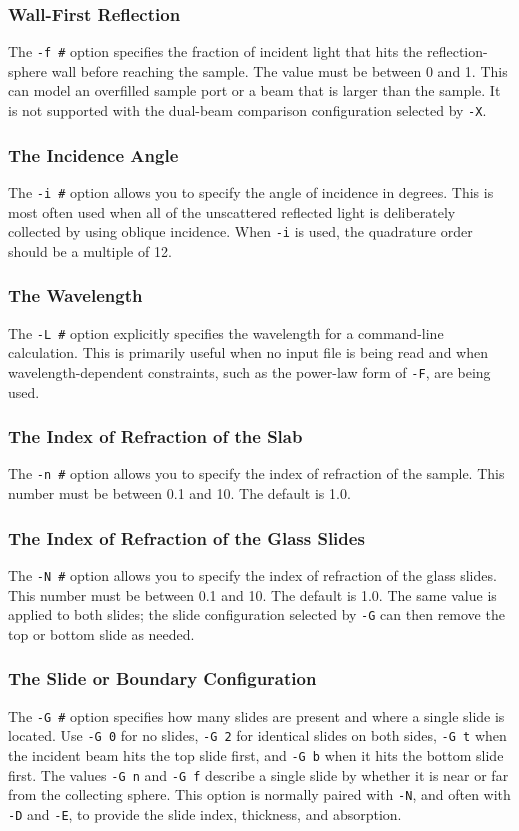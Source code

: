 \documentclass{article}
\begin{document}
\subsubsection{Wall-First Reflection}
The \texttt{-f \#} option specifies the fraction of incident light that hits
the reflection-sphere wall before reaching the sample.  The value must be
between 0 and 1.  This can model an overfilled sample port or a beam that is
larger than the sample.  It is not supported with the dual-beam comparison
configuration selected by \texttt{-X}.

\subsubsection{The Incidence Angle}
The \texttt{-i \#} option allows you to specify the angle of incidence in
degrees.  This is most often used when all of the unscattered reflected light
is deliberately collected by using oblique incidence.  When \texttt{-i} is
used, the quadrature order should be a multiple of 12.

\subsubsection{The Wavelength}
The \texttt{-L \#} option explicitly specifies the wavelength for a
command-line calculation.  This is primarily useful when no input file is
being read and when wavelength-dependent constraints, such as the power-law
form of \texttt{-F}, are being used.

\subsubsection{The Index of Refraction of the Slab}
The \texttt{-n \#} option allows you to specify the index of refraction of
the sample.  This number must be between 0.1 and 10.  The default is 1.0.

\subsubsection{The Index of Refraction of the Glass Slides}
The \texttt{-N \#} option allows you to specify the index of refraction of
the glass slides.  This number must be between 0.1 and 10.  The default is 1.0.
The same value is applied to both slides; the slide configuration selected by
\texttt{-G} can then remove the top or bottom slide as needed.

\subsubsection{The Slide or Boundary Configuration}
The \texttt{-G \#} option specifies how many slides are present and where a
single slide is located.  Use \texttt{-G 0} for no slides, \texttt{-G 2} for
identical slides on both sides, \texttt{-G t} when the incident beam hits the
top slide first, and \texttt{-G b} when it hits the bottom slide first.  The
values \texttt{-G n} and \texttt{-G f} describe a single slide by whether it is
near or far from the collecting sphere.  This option is normally paired with
\texttt{-N}, and often with \texttt{-D} and \texttt{-E}, to provide the slide
index, thickness, and absorption.
\end{document}
